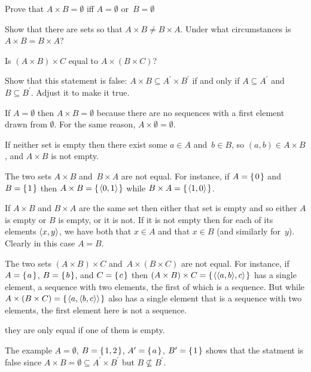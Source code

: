 \documentclass{ibl}
\begin{document}
\begin{ex}
\begin{exes}
\item Prove that $A\times B=\emptyset$ iff $A=\emptyset$ or~$B=\emptyset$
\item Show that there are sets so that $A\times B\neq B\times A$.
  Under what circumstances is $A\times B=B\times A$?
\item Is $(A\times B)\times C$ equal to $A\times (B\times C)$?
\item Show that this statement is false: 
  $A\times B\subseteq A^\prime\times B^\prime$ if and only if
  $A\subseteq A^\prime$ and $B\subseteq B^\prime$.
  Adjust it to make it true.
\end{exes}
\begin{ans}
\begin{exes}
\item If $A=\emptyset$ then $A\times B=\emptyset$ because there are no 
  sequences with a first element drawn from $\emptyset$.
  For the same reason, $A\times\emptyset=\emptyset$.
 
  If neither set is empty then there exist some $a\in A$ and~$b\in B$, so 
  $(a,b)\in A\times B$, and $A\times B$ is not empty.
\item The two sets $A\times B$ and~$B\times A$ are not equal. 
  For instance, if $A=\mbox{$\{\hspace{0.1em}0\hspace{0.1em}\}$}$ and~$B=\mbox{$\{\hspace{0.1em}1\hspace{0.1em}\}$}$ then 
  $A\times B=\mbox{$\{\hspace{0.1em}\langle0,1\rangle\hspace{0.1em}\}$}$
  while
  $B\times A=\mbox{$\{\hspace{0.1em}\langle1,0\rangle\hspace{0.1em}\}$}$.

  If $A\times B$ and $B\times A$ are the same set then either that set is empty 
  and so either $A$ is empty or $B$ is empty,
  or it is not.
  If it is not empty then for each of its elements $\langle x,y\rangle$,
  we have both that $x\in A$ and that $x\in B$ (and similarly for~$y$).
  Clearly in this case $A=B$.
\item The two sets $(A\times B)\times C$ and~$A\times (B\times C)$ 
  are not equal.
  For instance, if $A=\mbox{$\{\hspace{0.1em}a\hspace{0.1em}\}$}$, $B=\mbox{$\{\hspace{0.1em}b\hspace{0.1em}\}$}$, and $C=\mbox{$\{\hspace{0.1em}c\hspace{0.1em}\}$}$ then 
  $(A\times B)\times C=\mbox{$\{\hspace{0.1em}\langle\langle a,b\rangle,c\rangle\hspace{0.1em}\}$}$
  has a single element, a sequence with two elements, the first
  of which is a sequence.
  But while $A\times(B\times C)=\mbox{$\{\hspace{0.1em}\langle a,\langle b,c\rangle\rangle\hspace{0.1em}\}$}$ 
  also has a single element that is a sequence with two elements, 
  the first element here is not a sequence. 

  \remark they are only equal if one of them is empty.
\item The example 
  $A=\emptyset$, $B=\mbox{$\{\hspace{0.1em}1,2\hspace{0.1em}\}$}$, $A^\prime=\mbox{$\{\hspace{0.1em}a\hspace{0.1em}\}$}$, $B^\prime=\mbox{$\{\hspace{0.1em}1\hspace{0.1em}\}$}$
  shows that the statment is false since 
  $A\times B=\emptyset\subseteq A^\prime\times B^\prime$ but 
  $B\not\subseteq B^\prime$.


\end{exes}
\end{ans}
\end{ex}
\end{document}
